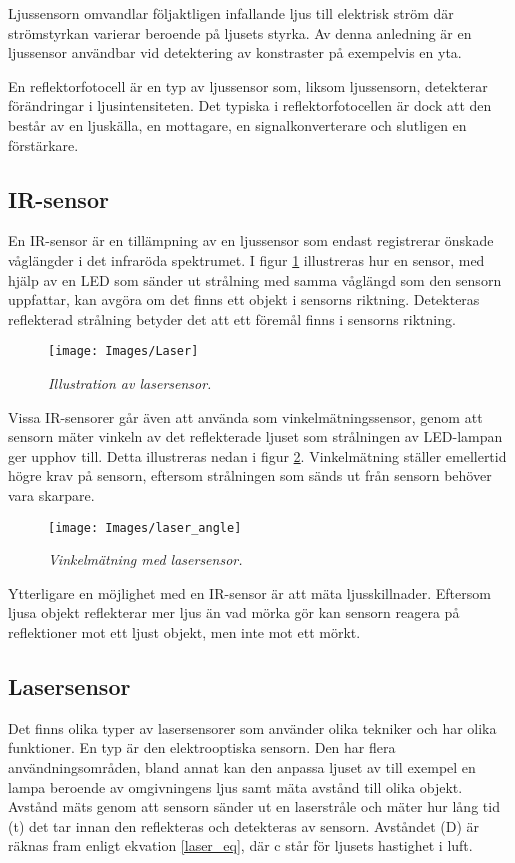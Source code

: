 \documentclass[11pt]{article}
\begin{document}
\begin{flushleft}
Ljussensorn omvandlar följaktligen infallande ljus till elektrisk ström där strömstyrkan varierar beroende på ljusets styrka. Av denna anledning är en ljussensor användbar vid detektering av konstraster på exempelvis en yta. \cite{612896}

En reflektorfotocell är en typ av ljussensor som, liksom ljussensorn, detekterar förändringar i ljusintensiteten. Det typiska i reflektorfotocellen är dock att den  består av en ljuskälla, en mottagare, en signalkonverterare och slutligen en förstärkare. \cite{website:automation} 


\subsection{IR-sensor}
En IR-sensor är en tillämpning av en ljussensor som endast registrerar önskade våglängder i det infraröda spektrumet. I figur \ref{Laser} illustreras hur en sensor, med hjälp av en LED som sänder ut strålning med samma våglängd som den sensorn uppfattar, kan avgöra om det finns ett objekt i sensorns riktning. Detekteras reflekterad strålning betyder det att ett föremål finns i sensorns riktning. \cite{website:cmu}

\begin{figure}[htbp]
	\centering
	\texttt{[image: Images/Laser]}
	\caption{\textit{Illustration av lasersensor.} \label{Laser}}
\end{figure}

Vissa IR-sensorer går även att använda som vinkelmätningssensor, genom att sensorn mäter vinkeln av det reflekterade ljuset som strålningen av LED-lampan ger upphov till. Detta illustreras nedan i figur \ref{laser_angle}. Vinkelmätning ställer emellertid högre krav på sensorn, eftersom strålningen som sänds ut från sensorn behöver vara skarpare.

\begin{figure}[htbp]
	\centering
	\texttt{[image: Images/laser\_angle]}
	\caption{\textit{Vinkelmätning med lasersensor.} \label{laser_angle}}
\end{figure}

Ytterligare en möjlighet med en IR-sensor är att mäta ljusskillnader. Eftersom ljusa objekt reflekterar mer ljus än vad mörka gör kan sensorn reagera på reflektioner mot ett ljust objekt, men inte mot ett mörkt. \cite{website:cmu}

\subsection{Lasersensor}
Det finns olika typer av lasersensorer som använder olika tekniker och har olika funktioner. En typ är den elektrooptiska sensorn. Den har flera användningsområden, bland annat kan den anpassa ljuset av till exempel en lampa beroende av omgivningens ljus samt mäta avstånd till olika objekt. Avstånd mäts genom att sensorn sänder ut en laserstråle och mäter hur lång tid (t) det tar innan den reflekteras och detekteras av sensorn. Avståndet (D) är räknas fram enligt ekvation \ref{laser_eq}, där c står för ljusets hastighet i luft. \cite{website:mti}



\end{flushleft}
\end{document}
